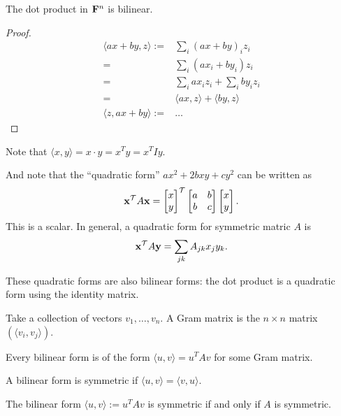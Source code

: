 \begin{claim*}
  The dot product in $\mathbf{F}^n$ is bilinear.
\end{claim*}

\begin{proof}
  \begin{align*}
    \langle ax + by , z \rangle :=& \sum_i (ax + by)_iz_i\\
                                 =& \sum_i (ax_i + by_i)z_i\\
                                 =& \sum_i ax_iz_i + \sum_i by_iz_i\\
                                 =& \langle ax, z \rangle + \langle by, z \rangle\\
    \langle z, ax + by \rangle  :=& \ldots
  \end{align*}
\end{proof}

Note that $\langle x, y \rangle = x \cdot y = x^Ty = x^TIy$.

And note that the ``quadratic form'' $ax^2 + 2bxy + cy^2$ can be written as
\begin{align*}
\mathbf x^\mathcal T A \mathbf x = \begin{bmatrix}x\\y\end{bmatrix}^\mathcal T \begin{bmatrix}a & b\\b & c\\ \end{bmatrix} \begin{bmatrix}x\\y\end{bmatrix}.
\end{align*}
This is a scalar. In general, a quadratic form for symmetric matric $A$ is
\begin{align*}
\mathbf x^\mathcal T A \mathbf y = \sum_{jk}A_{jk}x_jy_k.
\end{align*}

These quadratic forms are also bilinear forms: the dot product is a quadratic form using the
identity matrix.

\begin{definition*}
  Take a collection of vectors $v_1, \ldots, v_n$. A Gram matrix is the $n \times n$ matrix
  $(\langle v_i, v_j \rangle)$.
\end{definition*}

\begin{theorem*}
  Every bilinear form is of the form $\langle u, v \rangle = u^TAv$ for some Gram matrix.
\end{theorem*}

\begin{definition*}
  A bilinear form is symmetric if $\langle u, v \rangle = \langle v, u \rangle$.
\end{definition*}

\begin{theorem*}
  The bilinear form $\langle u, v \rangle := u^TAv$ is symmetric if and only if $A$ is symmetric.
\end{theorem*}

